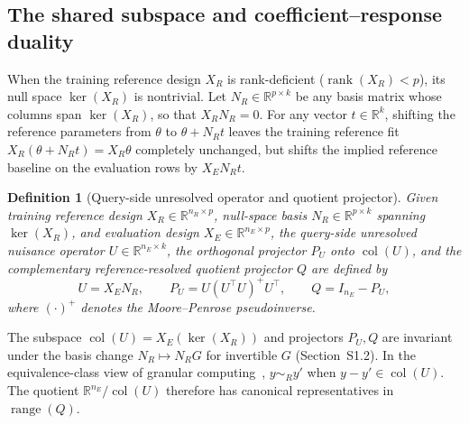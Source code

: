 \documentclass[preprint,12pt,number,sort&compress]{elsarticle}
\newtheorem{definition}{Definition}
\newcommand{\R}{\mathbb{R}}
\DeclareMathOperator{\rank}{rank}
\DeclareMathOperator{\col}{col}
\begin{document}
\subsection{The shared subspace and coefficient--response duality}
When the training reference design $X_R$ is rank-deficient ($\rank(X_R) < p$), its null space $\ker(X_R)$ is nontrivial. Let $N_R \in \R^{p \times k}$ be any basis matrix whose columns span $\ker(X_R)$, so that $X_R N_R = 0$. For any vector $t \in \R^k$, shifting the reference parameters from $\theta$ to $\theta + N_R t$ leaves the training reference fit $X_R(\theta + N_R t) = X_R \theta$ completely unchanged, but shifts the implied reference baseline on the evaluation rows by $X_E N_R t$.

\begin{definition}[Query-side unresolved operator and quotient projector]\label{def:quotient}
Given training reference design $X_R \in \R^{n_R \times p}$, null-space basis $N_R \in \R^{p \times k}$ spanning $\ker(X_R)$, and evaluation design $X_E \in \R^{n_E \times p}$, the \emph{query-side unresolved nuisance operator} $U \in \R^{n_E \times k}$, the orthogonal projector $P_U$ onto $\col(U)$, and the complementary \emph{reference-resolved quotient projector} $Q$ are defined by
\begin{equation}\label{eq:sharedspace}
U = X_E N_R, \qquad P_U = U(U^\top U)^+ U^\top, \qquad Q = I_{n_E} - P_U,
\end{equation}
where $(\cdot)^+$ denotes the Moore--Penrose pseudoinverse.
\end{definition}

The subspace $\col(U)=X_E(\ker(X_R))$ and projectors $P_U,Q$ are invariant under the basis change $N_R\mapsto N_RG$ for invertible $G$ (Section~S1.2). In the equivalence-class view of granular computing~\cite{bargiela2003granular,zhang2014quotient}, $y\sim_R y\prime$ when $y-y\prime\in\col(U)$. The quotient $\R^{n_E}/\col(U)$ therefore has canonical representatives in $\operatorname{range}(Q)$.
\end{document}
